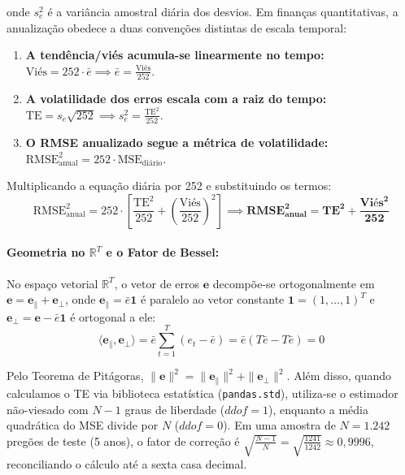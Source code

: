 \documentclass[11pt,a4paper]{article}
\begin{document}
\noindent onde $s_e^2$ é a variância amostral diária dos desvios. Em finanças quantitativas, a anualização obedece a duas convenções distintas de escala temporal:
\begin{enumerate}
    \item \textbf{A tendência/viés acumula-se linearmente no tempo:} $\text{Viés} = 252 \cdot \bar{e} \implies \bar{e} = \frac{\text{Viés}}{252}$.
    \item \textbf{A volatilidade dos erros escala com a raiz do tempo:} $\text{TE} = s_e \sqrt{252} \implies s_e^2 = \frac{\text{TE}^2}{252}$.
    \item \textbf{O RMSE anualizado segue a métrica de volatilidade:} $\text{RMSE}_{\text{anual}}^2 = 252 \cdot \text{MSE}_{\text{diário}}$.
\end{enumerate}

Multiplicando a equação diária por 252 e substituindo os termos:
\begin{equation}
\text{RMSE}_{\text{anual}}^2 = 252 \cdot \left[ \frac{\text{TE}^2}{252} + \left(\frac{\text{Viés}}{252}\right)^2 \right] \implies \mathbf{\text{RMSE}_{\text{anual}}^2 = \text{TE}^2 + \frac{\text{Viés}^2}{252}}
\end{equation}

\paragraph{Geometria no $\mathbb{R}^T$ e o Fator de Bessel:}
No espaço vetorial $\mathbb{R}^T$, o vetor de erros $\mathbf{e}$ decompõe-se ortogonalmente em $\mathbf{e} = \mathbf{e}_{\parallel} + \mathbf{e}_{\perp}$, onde $\mathbf{e}_{\parallel} = \bar{e}\mathbf{1}$ é paralelo ao vetor constante $\mathbf{1} = (1, \dots, 1)^T$ e $\mathbf{e}_{\perp} = \mathbf{e} - \bar{e}\mathbf{1}$ é ortogonal a ele:
\begin{equation}
\langle \mathbf{e}_{\parallel}, \mathbf{e}_{\perp} \rangle = \bar{e} \sum_{t=1}^T (e_t - \bar{e}) = \bar{e}(T\bar{e} - T\bar{e}) = 0
\end{equation}

Pelo Teorema de Pitágoras, $\|\mathbf{e}\|^2 = \|\mathbf{e}_{\parallel}\|^2 + \|\mathbf{e}_{\perp}\|^2$. Além disso, quando calculamos o TE via biblioteca estatística (\texttt{pandas.std}), utiliza-se o estimador não-viesado com $N-1$ graus de liberdade ($ddof=1$), enquanto a média quadrática do MSE divide por $N$ ($ddof=0$). Em uma amostra de $N = 1.242$ pregões de teste (5 anos), o fator de correção é $\sqrt{\frac{N-1}{N}} = \sqrt{\frac{1241}{1242}} \approx 0,9996$, reconciliando o cálculo até a sexta casa decimal.
\end{document}
